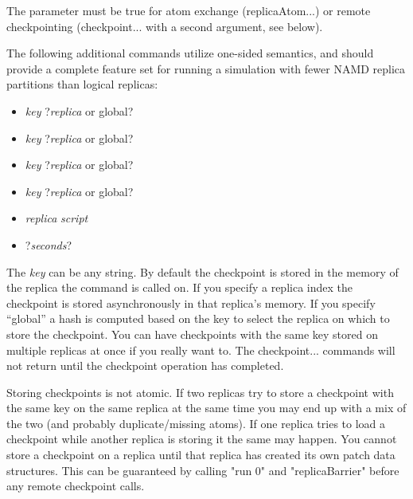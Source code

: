 The parameter {} must be true for 
atom exchange (replicaAtom...) or remote checkpointing (checkpoint... with a second argument, see below).

The following additional commands utilize one-sided semantics,
and should provide a complete feature set for running a simulation with
fewer NAMD replica partitions than logical replicas:

\begin{itemize}
  \item {} {\em key} ?{\em replica} or global?
  \item {} {\em key} ?{\em replica} or global?
  \item {} {\em key} ?{\em replica} or global?
  \item {} {\em key} ?{\em replica} or global?
  \item {} {\em replica} {\em script}
  \item {} ?{\em seconds}?
\end{itemize}

The {\em key} can be any string.
By default the checkpoint is stored in the memory of the replica the command is called on.
If you specify a replica index the checkpoint is stored asynchronously in that replica's memory.
If you specify ``global'' a hash is computed based on the key to select the replica on which
to store the checkpoint.
You can have checkpoints with the same key stored on multiple replicas at once if you really want to.
The checkpoint... commands will not return until the checkpoint operation has completed.

Storing checkpoints is not atomic.
If two replicas try to store a checkpoint with the same key on the same replica at the same
time you may end up with a mix of the two (and probably duplicate/missing atoms).
If one replica tries to load a checkpoint while another replica is storing it the same may happen.
You cannot store a checkpoint on a replica until that replica has created its own patch data structures.
This can be guaranteed by calling "run 0" and "replicaBarrier" before any remote checkpoint calls.

